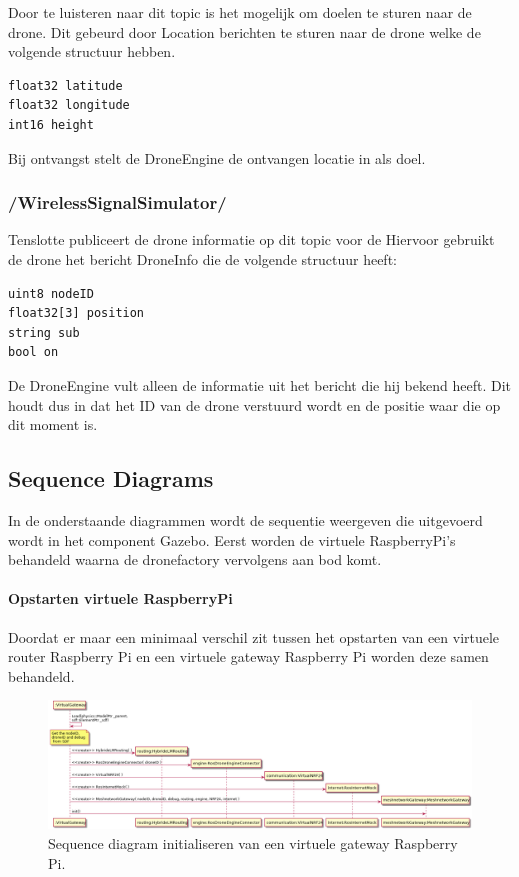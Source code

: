 \documentclass[a4paper, 11pt, oneside]{report}
\begin{document}
Door te luisteren naar dit topic is het mogelijk om doelen te sturen naar de drone. 
Dit gebeurd door Location berichten te sturen naar de drone welke de volgende structuur hebben.

\begin{lstlisting}
float32 latitude
float32 longitude
int16 height
\end{lstlisting}

Bij ontvangst stelt de DroneEngine de ontvangen locatie in als doel.

\subsubsection{\slash WirelessSignalSimulator\slash}
\label{DetailedDesign:MeshNetwerk:interfaces:droneinfo}
Tenslotte publiceert de drone informatie op dit topic voor de 
Hiervoor gebruikt de drone het bericht DroneInfo die de volgende structuur heeft:

\begin{lstlisting}
uint8 nodeID
float32[3] position
string sub
bool on
\end{lstlisting}

De DroneEngine vult alleen de informatie uit het bericht die hij bekend heeft.
Dit houdt dus in dat het ID van de drone verstuurd wordt en de positie waar die op dit moment is.

\subsection{Sequence Diagrams}
\label{DetailedDesign:MeshNetwerk:sequence}
In de onderstaande diagrammen wordt de sequentie weergeven die uitgevoerd wordt in het component Gazebo. 
Eerst worden de virtuele RaspberryPi's behandeld waarna de dronefactory vervolgens aan bod komt. 

\paragraph{Opstarten virtuele RaspberryPi}
\label{DetailedDesign:MeshNetwerk:sequence:startenRaspberryPi}
Doordat er maar een minimaal verschil zit tussen het opstarten van een virtuele router Raspberry Pi en een virtuele gateway Raspberry Pi worden deze samen behandeld.


\begin{figure}[H]
	\begin{center}\includegraphics[width=.90\linewidth]{UML/out/DroneSimulation/Sequence/VirtualGateway/VirtualGateway.png}\end{center}
	\caption{Sequence diagram initialiseren van een virtuele gateway Raspberry Pi.}
	\label{fig:communication:MeshNetwerk:sequence:gatewayRaspberryPi}
\end{figure}
\end{document}
